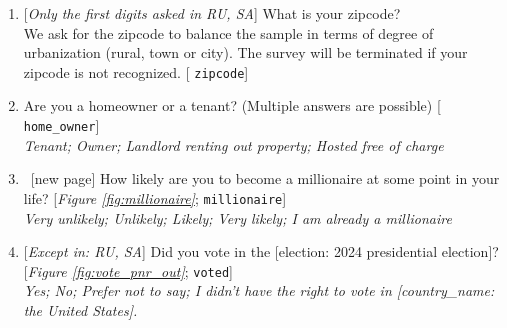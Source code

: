 \begin{enumerate}[resume]
\item  \label{q:zipcode} [\textit{Only the first digits asked in RU, SA}] What is your zipcode?\\
We ask for the zipcode to balance the sample in terms of degree of urbanization (rural, town or city). The survey will be terminated if your zipcode is not recognized. [%
\verb|zipcode|]


\item  \label{q:home} Are you a homeowner or a tenant? (Multiple answers are possible) [%
\verb|home_owner|]
  \\ \textit{Tenant; Owner; Landlord renting out property; Hosted free of charge}

\item ~[new page] \label{q:millionaire} How likely are you to become a millionaire at some point in your life? [\textit{Figure \ref{fig:millionaire}}; 
\verb|millionaire|]
  \\ \textit{Very unlikely; Unlikely; Likely; Very likely; I am already a millionaire}%

\item  \label{q:voted} [\textit{Except in: RU, SA}] Did you vote in the [election: 2024 presidential election]? [\textit{Figure%
\ref{fig:vote_pnr_out}}; 
\verb|voted|]
  \\ \textit{Yes; No; Prefer not to say; I didn't have the right to vote in [country\_name: the United States].}

\end{enumerate} 

